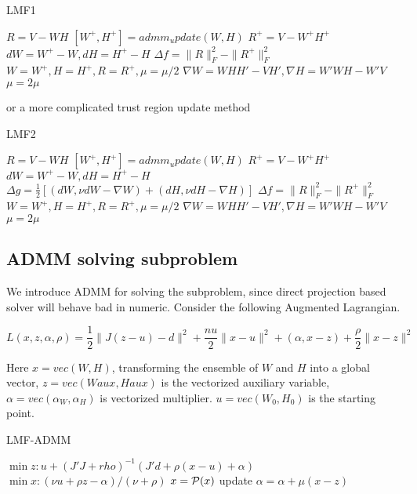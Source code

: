 \documentclass{article}
\renewcommand{\grad}{\nabla}
\begin{document}
\begin{algorithm}[H]
	\caption{LMF1}
	\begin{algorithmic}[1]
		\STATE $R = V - WH$
		\STATE $[W^+, H^+] = admm_update(W,H)$
		\STATE $R^+ = V - W^+H^+$
		\STATE $dW = W^+ - W, dH = H^+-H$
		\STATE $\Delta f = \|R\|_F^2 - \|R^+\|_F^2$
		\STATE $W = W^+, H = H^+, R = R^+, \mu = \mu/2$
		\STATE $\grad W = WHH'-VH', \grad H = W'WH-W'V$
		\ELSE
		\STATE $\mu = 2\mu$
		\ENDIF
		\ENDFOR
	\end{algorithmic}
\end{algorithm}
or a more complicated trust region update method
\begin{algorithm}[H]
	\caption{LMF2}
	\begin{algorithmic}[1]
		\STATE $R = V - WH$
		\STATE $[W^+, H^+] = admm_update(W,H)$
		\STATE $R^+ = V - W^+H^+$
		\STATE $dW = W^+ - W, dH = H^+-H$
		\STATE $\Delta g = \frac 12[(dW, \nu dW - \grad W) + (dH, \nu dH - \grad H)]$
		\STATE{$\nu = 4\nu$}
		\ENDIF
		\STATE $\Delta f = \|R\|_F^2 - \|R^+\|_F^2$
		\STATE $W = W^+, H = H^+, R = R^+, \mu = \mu/2$
		\STATE $\grad W = WHH'-VH', \grad H = W'WH-W'V$
		\ELSE
		\STATE $\mu = 2\mu$
		\ENDIF
		\ENDFOR
	\end{algorithmic}
\end{algorithm}

\subsection{ADMM solving subproblem}
We introduce ADMM for solving the subproblem, since direct projection based solver will behave bad in numeric. Consider the following Augmented Lagrangian.

$$L(x, z, \alpha, \rho) = \frac{1}{2}\|J(z-u) - d\|^2 + \frac{nu}{2}\|x-u\|^2 + (\alpha, x-z) + \frac{\rho}{2}\|x-z\|^2$$

Here $x = vec(W,H)$, transforming the ensemble of $W$ and $H$ into a global vector, $z = vec(Waux, Haux)$ is the vectorized auxiliary variable, $\alpha = vec(\alpha_W, \alpha_H)$ is vectorized multiplier. $u = vec(W_0, H_0)$ is the starting point.
\begin{algorithm}[H]
	\caption{LMF-ADMM}
	\begin{algorithmic}[1]
		\STATE $\min z: u + (J'J + rho)^{-1}(J'd + \rho(x-u) + \alpha)$
		\STATE $\min x: (\nu u + \rho z - \alpha)/(\nu + \rho)$
		\STATE $x = \P(x)$
		\STATE update $\alpha = \alpha + \mu (x-z)$
	\end{algorithmic}
\end{algorithm}
\end{document}
